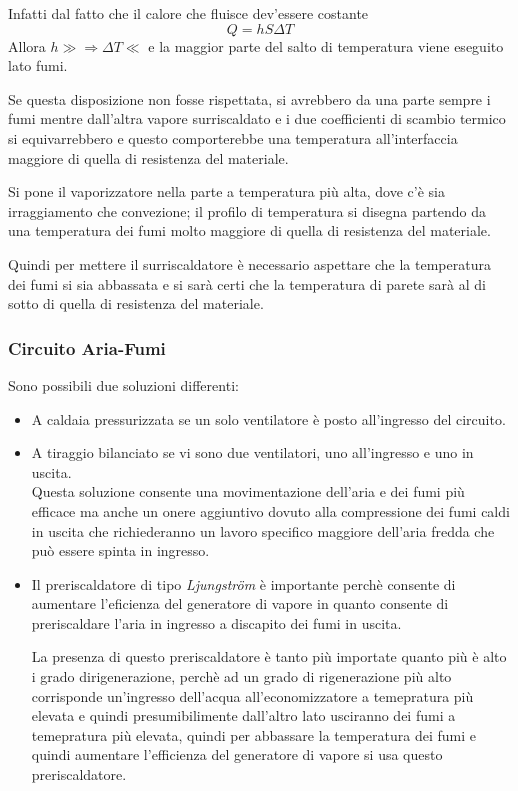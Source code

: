 \begin{adjustwidth}{2in}{}
			Infatti dal fatto che il calore che fluisce dev'essere costante
			\[Q = hS\Delta T\]
			Allora $h\gg\Rightarrow\Delta T\ll$ e la maggior parte del salto di temperatura viene eseguito lato fumi. 
			
			Se questa disposizione non fosse rispettata, si avrebbero da una parte sempre i fumi mentre dall'altra vapore surriscaldato e i due coefficienti di scambio termico si equivarrebbero e questo comporterebbe una temperatura all'interfaccia maggiore di quella di resistenza del materiale. 			
			
			Si pone il vaporizzatore nella parte a temperatura più alta, dove c'è sia irraggiamento che convezione; il profilo di temperatura si disegna partendo da una temperatura dei fumi molto maggiore di quella di resistenza del materiale. 
			
			Quindi per mettere il surriscaldatore è necessario aspettare che la temperatura dei fumi si sia abbassata e si sarà certi che la temperatura di parete sarà al di sotto di quella di resistenza del materiale. 
			 						
			\subsubsection{Circuito Aria-Fumi}
			Sono possibili due soluzioni differenti:
			\begin{itemize}
				\item A caldaia pressurizzata se un solo ventilatore è posto all'ingresso del circuito.
				\item A tiraggio bilanciato se vi sono due ventilatori, uno all'ingresso e uno in uscita. \\
				Questa soluzione consente una movimentazione dell'aria  e dei fumi più efficace ma anche un onere aggiuntivo dovuto alla compressione dei fumi caldi in uscita che richiederanno un lavoro specifico maggiore dell'aria fredda che può essere spinta in ingresso. 
				\item Il preriscaldatore di tipo \textit{Ljungström} è importante perchè consente di aumentare  l'eficienza del generatore di vapore in quanto consente di preriscaldare  l'aria in ingresso a discapito dei fumi in uscita. 
				
				La presenza di questo preriscaldatore è tanto più importate quanto più è alto i grado dirigenerazione, perchè  ad un grado di rigenerazione più alto corrisponde un'ingresso dell'acqua all'economizzatore a temepratura più elevata e quindi presumibilimente  dall'altro lato usciranno dei fumi a temepratura più elevata, quindi per abbassare  la temperatura dei fumi e quindi aumentare l'efficienza del generatore di vapore si usa questo preriscaldatore. 
				

\end{itemize}
\end{adjustwidth}

